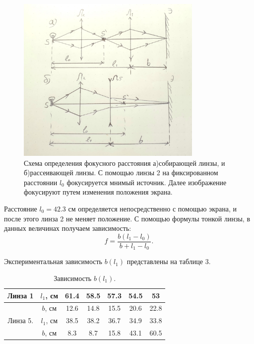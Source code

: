 \documentclass[a4paper, 14pt]{extarticle}%
\newcommand\ECaption[1]{%
     \captionsetup{font=footnotesize}%
     \caption{#1}}
\begin{document}
\begin{figure}[h!]
\begin{center}
\includegraphics[width=0.8\textwidth]{3}
\end{center}
\ECaption{Схема определения фокусного расстояния а)собирающей линзы, и б)рассеивающей линзы. С помощью линзы 2 на фиксированном расстоянии $l_0$ фокусируется мнимый источник. Далее изображение фокусируют путем изменения положения экрана.}
\end{figure}

Расстояние $l_0 = 42.3$ см определяется непосредственно с помощью экрана, и после этого линза 2 не меняет положение. С помощью формулы тонкой линзы, в данных величинах получаем зависимость:
\begin{equation}
f = \frac{b(l_1-l_0)}{b+l_1-l_0}.
\end{equation}

Экспериментальная зависимость $b(l_1)$ представлены на таблице 3.

\begin{table}[h!]
\begin{center}
\begin{tabular}{|c|c|c|c|c|c|c|}
\hline
\rowcolor[HTML]{9698ED} 
Линза 1  & $l_1$, см & 61.4 & 58.5 & 57.3 & 54.5 & 53   \\ \hline
         & $b$, см   & 12.6 & 14.8 & 15.5 & 20.6 & 22.8 \\ \hline
\rowcolor[HTML]{9698ED} 
Линза 5. & $l_1$, см & 38.5 & 38.2 & 36.7 & 34.9 & 33.8 \\ \hline
         & $b$, см   & 8.3  & 8.7  & 15.8 & 43.1 & 60.5 \\ \hline
\end{tabular}
\ECaption{Зависимость $b(l_1)$.}
\end{center}
\end{table}
\end{document}
